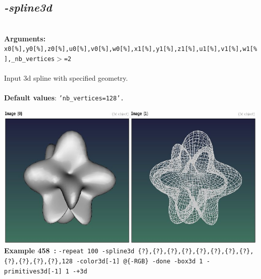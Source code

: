 \documentclass[a4paper,11pt,twoside]{book}
\begin{document}
\subsection{\emph{-spline3d} }\vspace*{-0.5em}
~\\\textbf{Arguments: } 
{\small \texttt{x0[\%],y0[\%],z0[\%],u0[\%],v0[\%],w0[\%],x1[\%],y1[\%],z1[\%],u1[\%],v1[\%],w1[\%],\_nb\_vertices$>$=2}}\\~\\
Input 3d spline with specified geometry.
~\\~\\\textbf{Default values}: {\small \texttt{'nb\_vertices=128'.}}
\begin{center}\includegraphics[keepaspectratio=true,height=7cm,width=\textwidth]{img/gmic_def458.jpg}\\
{\footnotesize \textbf{Example 458~:} \texttt{-repeat 100 -spline3d \{?\},\{?\},\{?\},\{?\},\{?\},\{?\},\{?\},\{?\},\{?\},\{?\},\{?\},\{?\},128 -color3d[-1] @\{-RGB\} -done -box3d 1 -primitives3d[-1] 1 -+3d}}
\end{center}
\end{document}
